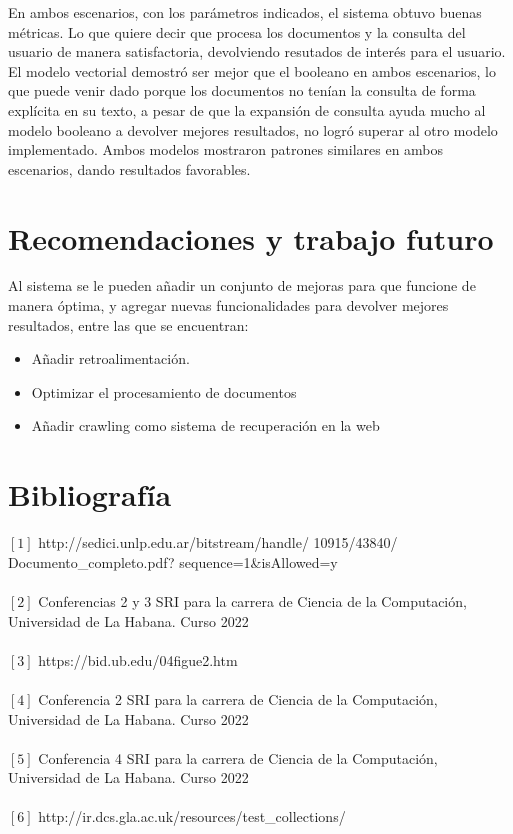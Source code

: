 \documentclass[twoside]{article}
\begin{document}
En ambos escenarios, con los par\'ametros indicados, el sistema obtuvo buenas m\'etricas. Lo que quiere decir que procesa los documentos y la consulta del usuario de manera satisfactoria, devolviendo resutados de inter\'es para el usuario. El modelo vectorial demostr\'o ser mejor que el booleano en ambos escenarios, lo que puede venir dado porque los documentos no ten\'ian la consulta de forma expl\'icita en su texto, a pesar de que la expansi\'on de consulta ayuda mucho al modelo booleano a devolver mejores resultados, no logr\'o superar al otro modelo implementado. Ambos modelos mostraron patrones similares en ambos escenarios, dando resultados favorables. 

\section{Recomendaciones y trabajo futuro}
\qquad Al sistema se le pueden a\~nadir un conjunto de mejoras para que funcione de manera \'optima, y agregar nuevas funcionalidades para devolver mejores resultados, entre las que se encuentran:
\begin{itemize}
\item A\~nadir retroalimentaci\'on.
\item Optimizar el procesamiento de documentos
\item A\~nadir crawling como sistema de recuperaci\'on en la web
\end{itemize}






\section{Bibliograf\'ia}
$[1]$ http://sedici.unlp.edu.ar/bitstream/handle/ 10915/43840/ Documento\_completo.pdf? sequence=1\&isAllowed=y\\\\
$[2]$ Conferencias 2 y 3 SRI para la carrera de Ciencia de la Computaci\'on, Universidad de La Habana. Curso 2022\\\\ 
$[3]$ https://bid.ub.edu/04figue2.htm\\\\
$[4]$ Conferencia 2 SRI para la carrera de Ciencia de la Computaci\'on, Universidad de La Habana. Curso 2022\\\\
$[5]$ Conferencia 4 SRI para la carrera de Ciencia de la Computaci\'on, Universidad de La Habana. Curso 2022\\\\
$[6]$ http://ir.dcs.gla.ac.uk/resources/test\_collections/

\end{document}
